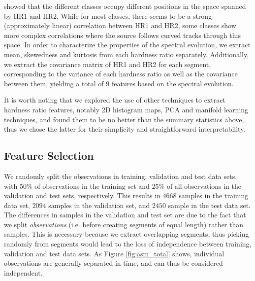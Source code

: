 \documentclass[fleqn,usenatbib]{mnras}
\begin{document}
\citet{belloni2000} showed that the different classes occupy different positions in the space spanned by HR1 and HR2. While for most classes, there seems to be a strong (approximately linear) correlation between HR1 and HR2, some classes show more complex correlations where the source follows curved tracks through this space. In order to characterize the properties of the spectral evolution, we extract mean, skewedness and kurtosis from each hardness ratio separately. Additionally, we extract the covariance matrix of HR1 and HR2 for each segment, corresponding to the variance of each hardness ratio as well as the covariance between them, yielding a total of $9$ features based on the spectral evolution.

It is worth noting that we explored the use of other techniques to extract hardness ratio features, notably 2D histogram maps, PCA and manifold learning techniques, and found them to be no better than the summary statistics above, thus we chose the latter for their simplicity and straightforward interpretability. 


\subsection{Feature Selection}
\label{sec:featureselection}

We randomly split the observations in training, validation and test data sets, with $50\%$ of observations in the training set and $25\%$ of all observations in the validation and test sets, respectively. This results in $4668$ samples in the training data set, $2094$ samples in the validation set, and $2450$ sample in the test data set. The differences in samples in the validation and test set are due to the fact that we split \textit{observations} (i.e. before creating segments of equal length) rather than samples. This is necessary because we extract overlapping segments, thus picking randomly from segments would lead to the loss of independence between training, validation and test data sets. As Figure \ref{fig:asm_total} shows, individual observations are generally separated in time, and can thus be considered independent.
\end{document}
